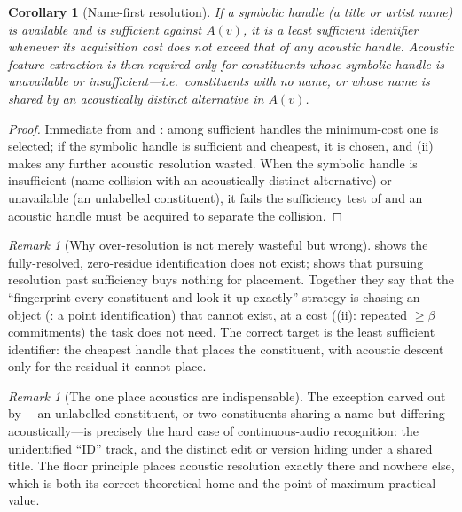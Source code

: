 \documentclass[11pt,twocolumn,a4paper]{article}
\theoremstyle{thmstyle}
\newtheorem{corollary}[theorem]{Corollary}
\theoremstyle{definition}
\theoremstyle{remark}
\newtheorem{remark}[theorem]{Remark}
\newcommand{\flo}{\beta}
\begin{document}
\begin{corollary}[Name-first resolution]
\label{cor:name-first}
If a symbolic handle (a title or artist name) is available and is sufficient
against $A(v)$, it is a least sufficient identifier whenever its acquisition cost
does not exceed that of any acoustic handle. Acoustic feature extraction is then
required only for constituents whose symbolic handle is unavailable or
insufficient---i.e.\ constituents with no name, or whose name is shared by an
acoustically distinct alternative in $A(v)$.
\end{corollary}

\begin{proof}
Immediate from  and : among sufficient
handles the minimum-cost one is selected; if the symbolic handle is sufficient
and cheapest, it is chosen, and (ii) makes any further
acoustic resolution wasted. When the symbolic handle is insufficient (name
collision with an acoustically distinct alternative) or unavailable (an
unlabelled constituent), it fails the sufficiency test of  and an
acoustic handle must be acquired to separate the collision.
\end{proof}

\begin{remark}[Why over-resolution is not merely wasteful but wrong]
\label{rem:overresolve}
 shows the fully-resolved, zero-residue identification does
not exist;  shows that pursuing resolution past sufficiency
buys nothing for placement. Together they say that the ``fingerprint every
constituent and look it up exactly'' strategy is chasing an object
(: a point identification) that cannot exist, at a cost
((ii): repeated $\ge\flo$ commitments) the task does not
need. The correct target is the least sufficient identifier: the cheapest handle
that places the constituent, with acoustic descent only for the residual it
cannot place.
\end{remark}

\begin{remark}[The one place acoustics are indispensable]
\label{rem:id-tracks}
The exception carved out by ---an unlabelled constituent, or
two constituents sharing a name but differing acoustically---is precisely the
hard case of continuous-audio recognition: the unidentified ``ID'' track, and the
distinct edit or version hiding under a shared title. The floor principle places
acoustic resolution exactly there and nowhere else, which is both its correct
theoretical home and the point of maximum practical value.
\end{remark}
\end{document}
